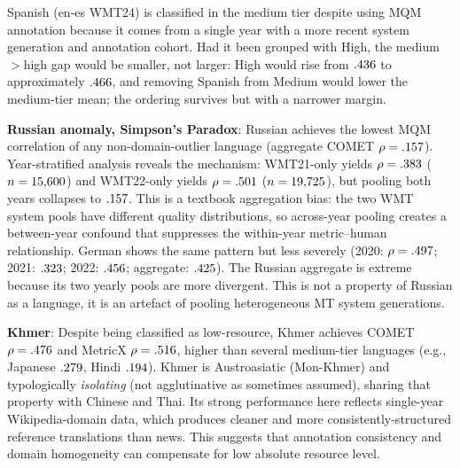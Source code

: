 \documentclass[11pt]{article}
\begin{document}
Spanish (en-es WMT24) is classified in the medium tier despite using MQM annotation because it comes from a single year with a more recent system generation and annotation cohort. Had it been grouped with High, the medium$>$high gap would be smaller, not larger: High would rise from $.436$ to approximately $.466$, and removing Spanish from Medium would lower the medium-tier mean; the ordering survives but with a narrower margin.

\textbf{Russian anomaly, Simpson's Paradox}: Russian achieves the lowest MQM correlation of any non-domain-outlier language (aggregate COMET $\rho=.157$). Year-stratified analysis reveals the mechanism: WMT21-only yields $\rho=.383$ ($n=15{,}600$) and WMT22-only yields $\rho=.501$ ($n=19{,}725$), but pooling both years collapses to $.157$. This is a textbook aggregation bias: the two WMT system pools have different quality distributions, so across-year pooling creates a between-year confound that suppresses the within-year metric--human relationship. German shows the same pattern but less severely (2020: $\rho=.497$; 2021: $.323$; 2022: $.456$; aggregate: $.425$). The Russian aggregate is extreme because its two yearly pools are more divergent. This is not a property of Russian as a language, it is an artefact of pooling heterogeneous MT system generations.

\textbf{Khmer}: Despite being classified as low-resource, Khmer achieves COMET $\rho=.476$ and MetricX $\rho=.516$, higher than several medium-tier languages (e.g., Japanese $.279$, Hindi $.194$). Khmer is Austroasiatic (Mon-Khmer) and typologically \emph{isolating} (not agglutinative as sometimes assumed), sharing that property with Chinese and Thai. Its strong performance here reflects single-year Wikipedia-domain data, which produces cleaner and more consistently-structured reference translations than news. This suggests that annotation consistency and domain homogeneity can compensate for low absolute resource level.
\end{document}
